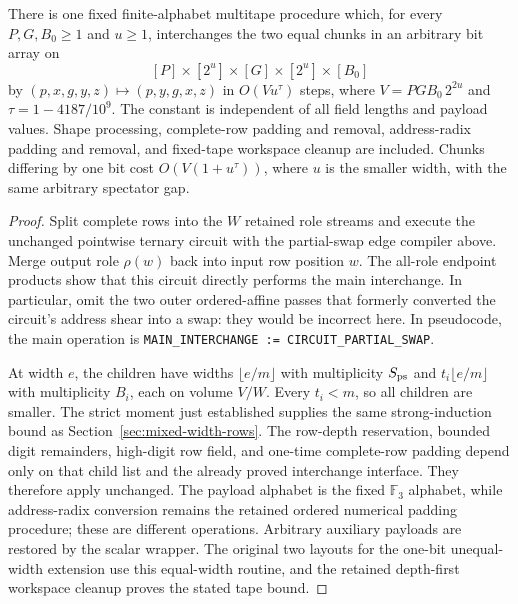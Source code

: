 \begin{lemma}
\label{lem:partial-swap-ternary-chunk-swap}
There is one fixed finite-alphabet multitape procedure which, for every
$P,G,B_0\ge1$ and $u\ge1$, interchanges the two equal chunks in an
arbitrary bit array on
\[
 [P]\times[2^u]\times[G]\times[2^u]\times[B_0]
\]
by $(p,x,g,y,z)\mapsto(p,y,g,x,z)$ in $O(Vu^\tau)$ steps, where
$V=PGB_0\,2^{2u}$ and $\tau=1-4187/10^9$. The constant is independent
of all field lengths and payload values. Shape processing, complete-row
padding and removal, address-radix padding and removal, and fixed-tape
workspace cleanup are included. Chunks differing by one bit cost
$O(V(1+u^\tau))$, where $u$ is the smaller width, with the same arbitrary
spectator gap.
\end{lemma}
\begin{proof}
Split complete rows into the $W$ retained role streams and execute the
unchanged pointwise ternary circuit with the partial-swap edge compiler
above. Merge output role $\rho(w)$ back into input row position $w$.
The all-role endpoint products show that this circuit directly performs
the main interchange. In particular, omit the two outer ordered-affine
passes that formerly converted the circuit's address shear into a swap:
they would be incorrect here. In pseudocode, the main operation is
\texttt{MAIN\_INTERCHANGE := CIRCUIT\_PARTIAL\_SWAP}.

At width $e$, the children have widths $\lfloor e/m\rfloor$ with
multiplicity $S_{\rm ps}$ and $t_i\lfloor e/m\rfloor$ with
multiplicity $B_i$, each on volume $V/W$. Every $t_i<m$, so all
children are smaller. The strict moment just established supplies the
same strong-induction bound as Section~\ref{sec:mixed-width-rows}.
The row-depth reservation, bounded digit remainders, high-digit row
field, and one-time complete-row padding depend only on that child list
and the already proved interchange interface. They therefore apply
unchanged. The payload alphabet is the fixed $\mathbb F_3$ alphabet,
while address-radix conversion remains the retained ordered numerical
padding procedure; these are different operations. Arbitrary auxiliary
payloads are restored by the scalar wrapper. The original two layouts
for the one-bit unequal-width extension use this equal-width routine,
and the retained depth-first workspace cleanup proves the stated tape
bound.
\end{proof}

